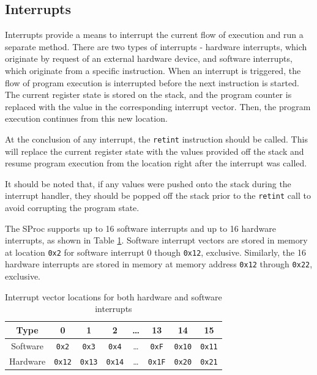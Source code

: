 \documentclass{article}
\begin{document}
\subsection{Interrupts}

Interrupts provide a means to interrupt the current flow of execution and run a separate method. There are two types of interrupts - hardware interrupts, which originate by request of an external hardware device, and software interrupts, which originate from a specific instruction. When an interrupt is triggered, the flow of program execution is interrupted before the next instruction is started. The current register state is stored on the stack, and the program counter is replaced with the value in the corresponding interrupt vector. Then, the program execution continues from this new location.

At the conclusion of any interrupt, the \texttt{retint} instruction should be called. This will replace the current register state with the values provided off the stack and resume program execution from the location right after the interrupt was called.

It should be noted that, if any values were pushed onto the stack during the interrupt handler, they should be popped off the stack prior to the \texttt{retint} call to avoid corrupting the program state.

The SProc supports up to 16 software interrupts and up to 16 hardware interrupts, as shown in Table \ref{table:interrupt-vector-locations}. Software interrupt vectors are stored in memory at location \texttt{0x2} for software interrupt 0 though \texttt{0x12}, exclusive. Similarly, the 16 hardware interrupts are stored in memory at memory address \texttt{0x12} through \texttt{0x22}, exclusive.

\begin{table}[h!]
	\centering
	\begin{tabular}{c|ccccccc}
		\hline
		Type & 0 & 1 & 2 & \dots & 13 & 14 & 15 \\
		\hline
		Software & \texttt{0x2} & \texttt{0x3} & \texttt{0x4} & \dots & \texttt{0xF} & \texttt{0x10} & \texttt{0x11} \\
		Hardware & \texttt{0x12} & \texttt{0x13} & \texttt{0x14} & \dots & \texttt{0x1F} & \texttt{0x20} & \texttt{0x21} \\
		\hline
	\end{tabular}
	\caption{Interrupt vector locations for both hardware and software interrupts}
	\label{table:interrupt-vector-locations}
\end{table}
\end{document}
